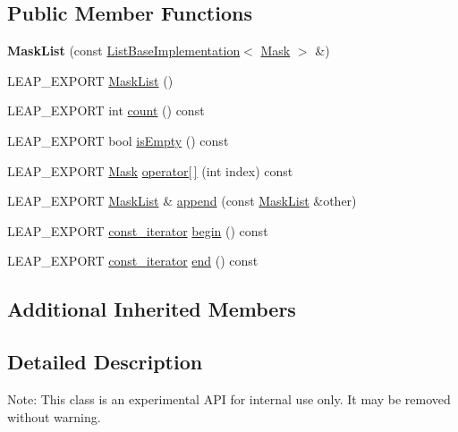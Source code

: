 \subsection*{Public Member Functions}
\begin{DoxyCompactItemize}
\item 
\mbox{\label{class_leap_1_1_mask_list_ac99108afe11c18783fd4c76e7a884b59}} 
{\bfseries Mask\+List} (const \hyperlink{class_leap_1_1_list_base_implementation}{List\+Base\+Implementation}$<$ \hyperlink{class_leap_1_1_mask}{Mask} $>$ \&)
\item 
L\+E\+A\+P\+\_\+\+E\+X\+P\+O\+RT \hyperlink{class_leap_1_1_mask_list_ab3bdfdd5be09ded98e9c2f586b77d640}{Mask\+List} ()
\item 
L\+E\+A\+P\+\_\+\+E\+X\+P\+O\+RT int \hyperlink{class_leap_1_1_mask_list_a768de3705c97cc0ddf5e03c4776123d6}{count} () const
\item 
L\+E\+A\+P\+\_\+\+E\+X\+P\+O\+RT bool \hyperlink{class_leap_1_1_mask_list_a41f3f8bb83d3addd214180c49b8a033e}{is\+Empty} () const
\item 
L\+E\+A\+P\+\_\+\+E\+X\+P\+O\+RT \hyperlink{class_leap_1_1_mask}{Mask} \hyperlink{class_leap_1_1_mask_list_ae977a3f2ab4749d6225997969d0476c3}{operator\mbox{[}$\,$\mbox{]}} (int index) const
\item 
L\+E\+A\+P\+\_\+\+E\+X\+P\+O\+RT \hyperlink{class_leap_1_1_mask_list}{Mask\+List} \& \hyperlink{class_leap_1_1_mask_list_acbde19bc85660b467662bcb2796f3a53}{append} (const \hyperlink{class_leap_1_1_mask_list}{Mask\+List} \&other)
\item 
L\+E\+A\+P\+\_\+\+E\+X\+P\+O\+RT \hyperlink{class_leap_1_1_const_list_iterator}{const\+\_\+iterator} \hyperlink{class_leap_1_1_mask_list_ae29ce07a589fe2b48a5e19368198668d}{begin} () const
\item 
L\+E\+A\+P\+\_\+\+E\+X\+P\+O\+RT \hyperlink{class_leap_1_1_const_list_iterator}{const\+\_\+iterator} \hyperlink{class_leap_1_1_mask_list_a1decd80ee1b76ee7bf7f4ed832c2bf19}{end} () const
\end{DoxyCompactItemize}
\subsection*{Additional Inherited Members}


\subsection{Detailed Description}
Note\+: This class is an experimental A\+PI for internal use only. It may be removed without warning.

